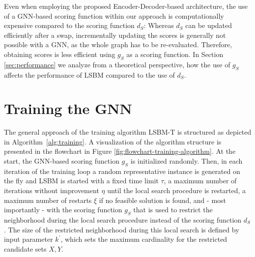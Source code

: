 \documentclass[draft,final]{vutinfth} %
\begin{document}
Even when employing the proposed Encoder-Decoder-based architecture, the use of a GNN-based scoring function within our approach is computationally expensive compared to the scoring function $d_S$:
Whereas $d_S$ can be updated efficiently after a swap, incrementally updating the scores is generally not possible with a GNN, as the whole graph has to be re-evaluated. Therefore, obtaining scores is less efficient using $g_S$ as a scoring function. In Section \ref{sec:performance} we analyze from a theoretical perspective, how the use of $g_S$ affects the performance of LSBM compared to the use of $d_S$. 




\section{Training the GNN}\label{sec:gnn-training}

The general approach of the training algorithm LSBM-T is structured as depicted in Algorithm~\ref{alg:training}. A visualization of the algorithm structure is presented in the flowchart in Figure \ref{fig:flowchart-training-algorithm}. 
At the start, the GNN-based scoring function $g_S$ is initialized randomly. Then, in each iteration of the training loop a random representative instance is generated on the fly and LSBM is started with a fixed time limit $\tau$, a maximum number of iterations without improvement $\eta$ until the local search procedure is restarted, a maximum number of restarts $\xi$ if no feasible solution is found, and - most importantly - with the scoring function $g_S$ that is used to restrict the neighborhood during the local search procedure instead of the scoring function $d_S$. The size of the restricted neighborhood during this local search is defined by input parameter $k^\prime$, which sets the maximum cardinality for the restricted candidate sets $X, Y$.
\end{document}

